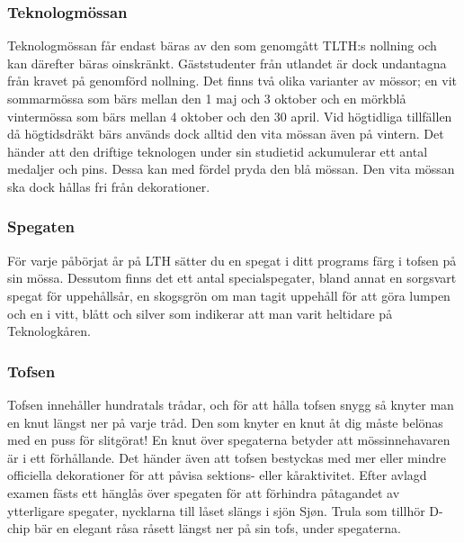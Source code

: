 \documentclass{article}
\begin{document}
\subsubsection{Teknologmössan}
Teknologmössan får endast bäras av den som genomgått
TLTH:s nollning och kan därefter bäras oinskränkt.
Gäststudenter från utlandet är dock undantagna från
kravet på genomförd nollning. Det finns två olika varianter
av mössor; en vit sommarmössa som bärs mellan den 1
maj och 3 oktober och en mörkblå vintermössa som bärs
mellan 4 oktober och den 30 april. Vid högtidliga tillfällen
då högtidsdräkt bärs används dock alltid den vita mössan
även på vintern.
Det händer att den driftige teknologen under sin studietid
ackumulerar ett antal medaljer och pins. Dessa kan med
fördel pryda den blå mössan. Den vita mössan ska dock
hållas fri från dekorationer.



\subsubsection{Spegaten}
För varje påbörjat år på LTH sätter du en spegat i ditt
programs färg i tofsen på sin mössa. Dessutom finns det
ett antal specialspegater, bland annat en sorgsvart
spegat för uppehållsår, en skogsgrön om man tagit
uppehåll för att göra lumpen och en i vitt, blått och silver
som indikerar att man varit heltidare på Teknologkåren.

\subsubsection{Tofsen}
Tofsen innehåller hundratals trådar, och för att hålla
tofsen snygg så knyter man en knut längst ner på varje
tråd. Den som knyter en knut åt dig måste belönas med
en puss för slitgörat! En knut över spegaterna betyder att
mössinnehavaren är i ett förhållande. Det händer även att
tofsen bestyckas med mer eller mindre officiella
dekorationer för att påvisa sektions- eller kåraktivitet. Efter
avlagd examen fästs ett hänglås över spegaten för att
förhindra påtagandet av ytterligare spegater, nycklarna till
låset slängs i sjön Sjøn. Trula som tillhör D-chip bär en
elegant råsa råsett längst ner på sin tofs, under
spegaterna.
\newpage
\end{document}

